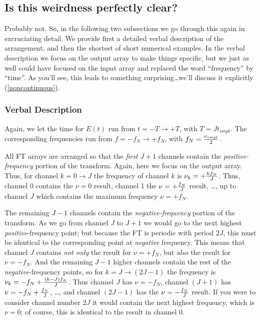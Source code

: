 \documentclass[psfig,preprint]{aastex}
\begin{document}
\subsection{ Is this weirdness perfectly clear? }

\label{clear}

	Probably not.  So, in the following two subsections we go
through this again in excruciating detail.  We provide first a detailed
verbal description of the arrangement, and then the shortest of short
numerical examples.  In the verbal description we focus on the output
array to make things specific, but we just as well could have focused
on the input array and replaced the word ``frequency'' by ``time''.  As
you'll see, this leads to something surprising\dots we'll discuss it
explicitly (\ref{noncontinuous}).

\subsubsection{Verbal Description}

	Again, we let the time for $E(t)$ run from $t = -T \rightarrow
+T$, with $T = J t_{smpl}$.  The corresponding frequencies run from $f =
-f_N \rightarrow +f_N$, with $f_N = {\nu_{smpl} \over 2}$. 

          All FT arrays are arranged so that the {\it first} $J+1$
channels contain the {\it positive-frequency} portion of the transform. 
Again, here we focus on the output array.  Thus, for channel $k = 0
\rightarrow J$ the frequency of channel $k$ is $\nu _k = +{k f_N \over
J}$.  Thus, channel 0 contains the $\nu =0$ result, channel 1 the $\nu =
+{f_N \over J}$ result, \dots, up to channel $J$ which contains the
maximum frequency $\nu = +f_N$. 

          The remaining $J-1$ channels contain the {\it
negative-frequency} portion of the transform.  As we go from channel $J$
to $J+1$ we would go to the next highest {\it positive}-frequency point;
but because the FT is periodic with period $2J$, this must be identical
to the corresponding point at {\it negative} frequency.  This means that
channel $J$ contains {\it not only} the result for $\nu = +f_N$, but {\it
also} the result for $\nu = -f_N$.  And the remaining $J-1$ higher
channels contain the rest of the {\it negative}-frequency points, so for
$k = J \rightarrow (2J-1)$ the frequency is $\nu _k = -f_N + {(k - J) f_N
\over J}$.  Thus channel $J$ has $\nu = -f_N$, channel $(J+1)$ has $\nu =
-f_N + {f_N \over J}$, \dots, and channel $(2J-1)$ has the $\nu = -{f_N
\over J}$ result.  If you were to consider channel number $2J$ it would
contain the next highest frequency, which is $\nu = 0$; of course, this
is identical to the result in channel 0. 
\end{document}
